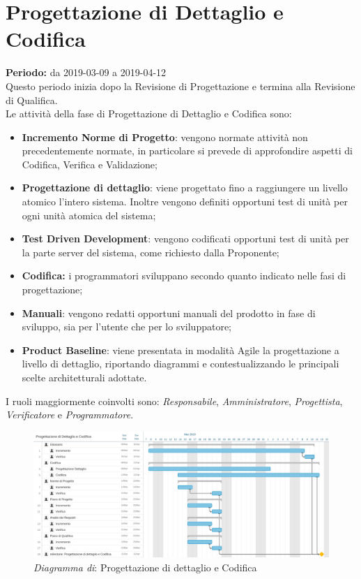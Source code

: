 \section{Progettazione di Dettaglio e Codifica}
\textbf{Periodo:} da 2019-03-09 a 2019-04-12\\
Questo periodo inizia dopo la Revisione di Progettazione e termina  alla Revisione di Qualifica.\\Le attività della fase di Progettazione di Dettaglio e Codifica sono:
\begin{itemize}
	\item \textbf{Incremento Norme di Progetto}: vengono normate attività non precedentemente normate, in particolare si prevede di approfondire aspetti di Codifica, Verifica e Validazione;
	\item \textbf{Progettazione di dettaglio}: viene progettato fino a raggiungere un livello atomico l'intero sistema. Inoltre vengono definiti opportuni test di unità per ogni unità atomica del sistema;
	\item \textbf{Test Driven Development}: vengono codificati opportuni test di unità per la parte server del sistema, come richiesto dalla Proponente;
	\item \textbf{Codifica:} i programmatori sviluppano secondo quanto indicato nelle fasi di progettazione;
	\item \textbf{Manuali}: vengono redatti opportuni manuali del prodotto in fase di sviluppo, sia per l'utente che per lo sviluppatore;
	\item \textbf{Product Baseline}: viene presentata in modalità Agile la progettazione a livello di dettaglio, riportando diagrammi e contestualizzando le principali scelte architetturali adottate.
\end{itemize}
I ruoli maggiormente coinvolti sono: \textit{Responsabile}, \textit{Amministratore}, \textit{Progettista}, \textit{Verificatore} e \textit{Programmatore}.
\begin{figure} [h]
    \centering
    \includegraphics[scale=0.14]{./images/codifica.jpg}
    \caption{\textit{Diagramma di}: Progettazione di dettaglio e Codifica }\label{}
\end{figure}
\newpage
